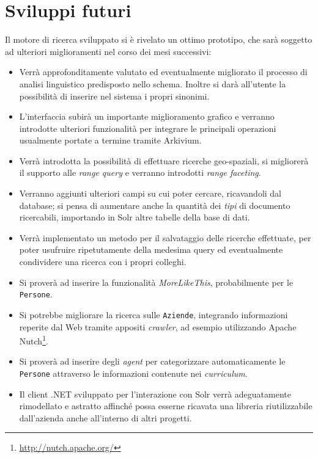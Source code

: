 \pagebreak
\section{Sviluppi futuri}

Il motore di ricerca sviluppato si è rivelato un ottimo prototipo, che sarà soggetto ad ulteriori miglioramenti nel corso dei mesi successivi:

\begin{itemize}
\item Verrà approfonditamente valutato ed eventualmente migliorato il processo di analisi linguistico predisposto nello schema. Inoltre si darà all’utente la possibilità di inserire nel sistema i propri sinonimi.
\item L’interfaccia subirà un importante miglioramento grafico e verranno introdotte ulteriori funzionalità per integrare le principali operazioni usualmente portate a termine tramite Arkivium.
\item Verrà introdotta la possibilità di effettuare ricerche geo-spaziali, si migliorerà il supporto alle \textit{range query} e verranno introdotti \textit{range faceting}.
\item Verranno aggiunti ulteriori campi su cui poter cercare, ricavandoli dal database; si pensa di aumentare anche la quantità dei \textit{tipi} di documento ricercabili, importando in Solr altre tabelle della base di dati.
\item Verrà implementato un metodo per il salvataggio delle ricerche effettuate, per poter usufruire ripetutamente della medesima query ed eventualmente condividere una ricerca con i propri colleghi.
\item Si proverà ad inserire la funzionalità \textit{MoreLikeThis}, probabilmente per le \texttt{Persone}.
\item Si potrebbe migliorare la ricerca sulle \texttt{Aziende}, integrando informazioni reperite dal Web tramite appositi \textit{crawler}, ad esempio utilizzando Apache Nutch\footnote{\url{http://nutch.apache.org/}}.
\item Si proverà ad inserire degli \textit{agent} per categorizzare automaticamente le \texttt{Persone} attraverso le informazioni contenute nei \textit{curriculum}.
\item Il client .NET sviluppato per l’interazione con Solr verrà adeguatamente rimodellato e astratto affinché possa esserne ricavata una libreria riutilizzabile dall’azienda anche all’interno di altri progetti.
\end{itemize}




























